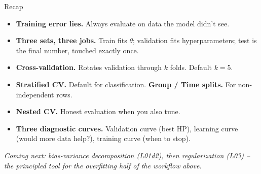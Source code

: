 \documentclass[aspectratio=169]{beamer}
\begin{document}
\begin{frame}{Recap}
  \begin{itemize}\small
    \item \textbf{Training error lies.} Always evaluate on data the model didn't see.
    \item \textbf{Three sets, three jobs.} Train fits $\theta$; validation fits hyperparameters; test is the final number, touched exactly once.
    \item \textbf{Cross-validation.} Rotates validation through $k$ folds. Default $k=5$.
    \item \textbf{Stratified CV.} Default for classification. \textbf{Group / Time splits.} For non-independent rows.
    \item \textbf{Nested CV.} Honest evaluation when you also tune.
    \item \textbf{Three diagnostic curves.} Validation curve (best HP), learning curve (would more data help?), training curve (when to stop).
  \end{itemize}
  \vfill
  \vfill
  \emph{Coming next: bias-variance decomposition (L01d2), then regularization (L03) -- the principled tool for the overfitting half of the workflow above.}
\end{frame}
\end{document}
